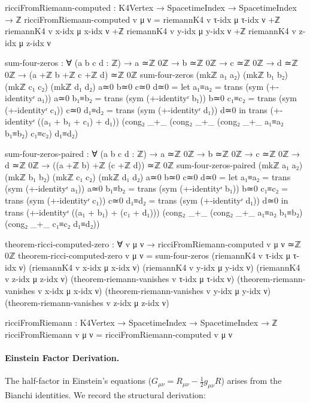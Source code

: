 \documentclass[11pt,a4paper]{book}
\begin{document}
\begin{code}
ricciFromRiemann-computed : K4Vertex → SpacetimeIndex → SpacetimeIndex → ℤ
ricciFromRiemann-computed v μ ν = 
  riemannK4 v τ-idx μ τ-idx ν +ℤ
  riemannK4 v x-idx μ x-idx ν +ℤ
  riemannK4 v y-idx μ y-idx ν +ℤ
  riemannK4 v z-idx μ z-idx ν

sum-four-zeros : ∀ (a b c d : ℤ) → a ≃ℤ 0ℤ → b ≃ℤ 0ℤ → c ≃ℤ 0ℤ → d ≃ℤ 0ℤ →
                 (a +ℤ b +ℤ c +ℤ d) ≃ℤ 0ℤ
sum-four-zeros (mkℤ a₁ a₂) (mkℤ b₁ b₂) (mkℤ c₁ c₂) (mkℤ d₁ d₂) a≃0 b≃0 c≃0 d≃0 =
  let a₁≡a₂ = trans (sym (+-identityʳ a₁)) a≃0
      b₁≡b₂ = trans (sym (+-identityʳ b₁)) b≃0
      c₁≡c₂ = trans (sym (+-identityʳ c₁)) c≃0
      d₁≡d₂ = trans (sym (+-identityʳ d₁)) d≃0
  in trans (+-identityʳ ((a₁ + b₁ + c₁) + d₁))
           (cong₂ _+_ (cong₂ _+_ (cong₂ _+_ a₁≡a₂ b₁≡b₂) c₁≡c₂) d₁≡d₂)

sum-four-zeros-paired : ∀ (a b c d : ℤ) → a ≃ℤ 0ℤ → b ≃ℤ 0ℤ → c ≃ℤ 0ℤ → d ≃ℤ 0ℤ →
                        ((a +ℤ b) +ℤ (c +ℤ d)) ≃ℤ 0ℤ
sum-four-zeros-paired (mkℤ a₁ a₂) (mkℤ b₁ b₂) (mkℤ c₁ c₂) (mkℤ d₁ d₂) a≃0 b≃0 c≃0 d≃0 = 
  let a₁≡a₂ = trans (sym (+-identityʳ a₁)) a≃0
      b₁≡b₂ = trans (sym (+-identityʳ b₁)) b≃0
      c₁≡c₂ = trans (sym (+-identityʳ c₁)) c≃0
      d₁≡d₂ = trans (sym (+-identityʳ d₁)) d≃0
  in trans (+-identityʳ ((a₁ + b₁) + (c₁ + d₁)))
           (cong₂ _+_ (cong₂ _+_ a₁≡a₂ b₁≡b₂) (cong₂ _+_ c₁≡c₂ d₁≡d₂))

theorem-ricci-computed-zero : ∀ v μ ν → ricciFromRiemann-computed v μ ν ≃ℤ 0ℤ
theorem-ricci-computed-zero v μ ν = 
  sum-four-zeros 
    (riemannK4 v τ-idx μ τ-idx ν)
    (riemannK4 v x-idx μ x-idx ν)
    (riemannK4 v y-idx μ y-idx ν)
    (riemannK4 v z-idx μ z-idx ν)
    (theorem-riemann-vanishes v τ-idx μ τ-idx ν)
    (theorem-riemann-vanishes v x-idx μ x-idx ν)
    (theorem-riemann-vanishes v y-idx μ y-idx ν)
    (theorem-riemann-vanishes v z-idx μ z-idx ν)

ricciFromRiemann : K4Vertex → SpacetimeIndex → SpacetimeIndex → ℤ
ricciFromRiemann v μ ν = ricciFromRiemann-computed v μ ν
\end{code}

\paragraph{Einstein Factor Derivation.}

The half-factor in Einstein's equations ($G_{\mu\nu} = R_{\mu\nu} - \frac{1}{2}g_{\mu\nu}R$) 
arises from the Bianchi identities. We record the structural derivation:
\end{document}
